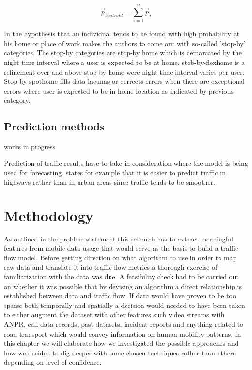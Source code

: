 \documentclass[12pt, a4paper]{report}
\theoremstyle{definition}
\theoremstyle{definition}%
\theoremstyle{definition}%
\theoremstyle{definition}%
\theoremstyle{definition}%
\theoremstyle{definition}%
\begin{document}
\begin{equation}
{\stackrel{\to }{p}}_{centroid} = \sum _{i=1}^{n}{\stackrel{\to }{p}}_{i}
\end{equation}

In \cite{Hoteit2016} the hypothesis that an individual tends to be found with high probability at his home or place of work makes the authors to come out with so-called 'stop-by' categories. The stop-by categories are stop-by home which is demarcated by the night time interval where a user is expected to be at home. stob-by-flexhome is a refinement over and above stop-by-home were night time interval varies per user. Stop-by-spothome fills data lacunas or corrects errors when there are exceptional errors where user is expected to be in home location as indicated by previous category.


\section{Prediction methods}

{works in progress}

Prediction of traffic results have to take in consideration where the model is being used for forecasting. \cite{Sommer2013} states for example that it is easier to predict traffic in highways rather than in urban areas since traffic tends to be smoother.





\chapter{Methodology} \label{chapter:methodology}

As outlined in the problem statement this research has to extract meaningful features from mobile data usage that would serve as the basis to build a traffic flow model. Before getting direction on what algorithm to use in order to map raw data and translate it into traffic flow metrics a thorough exercise of familiarization with the data was due. A feasibility check had to be carried out on whether it was possible that by devising an algorithm a direct relationship is established between data and traffic flow. If data would have proven to be too sparse both temporally and spatially a decision would needed to have been taken to either augment the dataset with other features such video streams with ANPR, call data records, past datasets, incident reports and anything related to road transport which would convey information on human mobility patterns. In this chapter we will elaborate how we investigated the possible approaches and how we decided to dig deeper with some chosen techniques rather than others depending on level of confidence.
\end{document}
